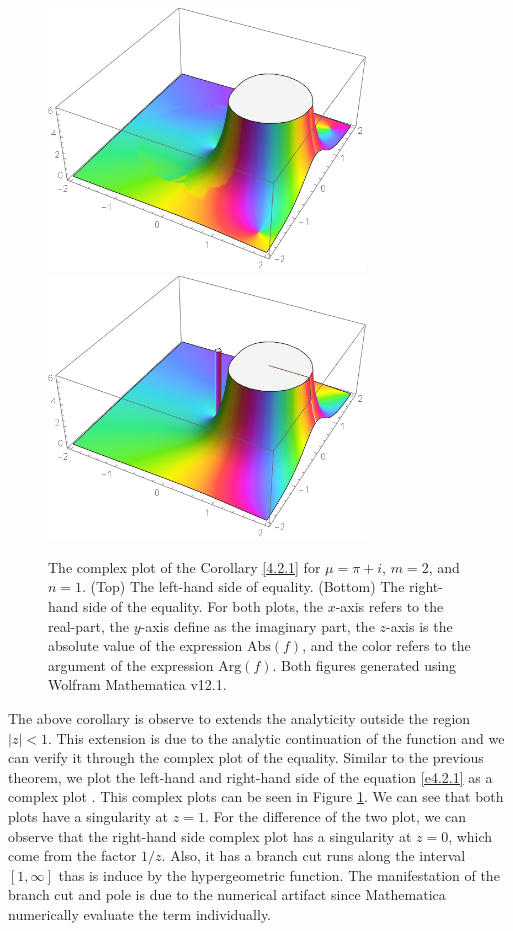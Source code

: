 \begin{figure}[t]
 	\centering
 	\includegraphics[width=0.75\textwidth]{4.2LHS.png}
 	 	\includegraphics[width=0.75\textwidth]{4.2RHS.png}
 	\caption{The complex plot of the Corollary \ref{4.2.1} for $\mu = \pi + i$, $m=2$, and $n=1$. (Top) The left-hand side of equality. (Bottom) The right-hand side of the equality. For both plots, the $x$-axis refers to the real-part, the $y$-axis define as the imaginary part, the $z$-axis is the absolute value of the expression $\mathrm{Abs}(f)$, and the color refers to the argument of the expression $\mathrm{Arg}(f)$. Both figures generated using Wolfram Mathematica v12.1.}
 	\label{F4.2.1}
 \end{figure}

The above corollary is observe to extends the analyticity outside the region $|z|<1$. This extension is due to the analytic continuation of the function and we can verify it through the complex plot of the equality. Similar to the previous theorem, we plot the left-hand and right-hand side of the equation \eqref{e4.2.1} as a complex plot . This complex plots can be seen in Figure \ref{F4.2.1}. We can see that both plots have a singularity at $z=1$. For the difference of the two plot, we can observe that the right-hand side complex plot has a singularity at $z=0$, which come from the factor $1/z$. Also, it has a branch cut runs along the interval $[1, \infty]$ thas is induce by the hypergeometric function. The manifestation of the branch cut and pole is due to the numerical artifact since Mathematica numerically evaluate the term individually.


